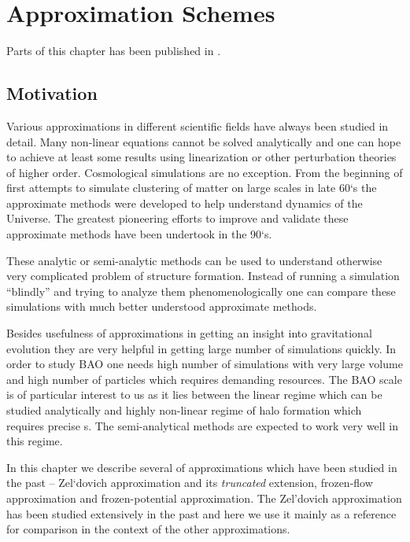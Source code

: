 \chapter{Approximation Schemes}
Parts of this chapter has been published in \textcite{2020MNRAS.493.2085V}.

\section{Motivation}
Various approximations in different scientific fields have always been studied in detail. Many non-linear equations cannot be solved analytically and one can hope to achieve at least some results using linearization or other perturbation theories of higher order. Cosmological simulations are no exception. From the beginning of first attempts to simulate clustering of matter on large scales in late 60`s the approximate methods were developed to help understand dynamics of the Universe. The greatest pioneering efforts to improve and validate these approximate methods have been undertook in the 90`s.

These analytic or semi-analytic methods can be used to understand otherwise very complicated problem of structure formation. Instead of running a simulation ``blindly'' and trying to analyze them phenomenologically one can compare these simulations with much better understood approximate methods.

Besides usefulness of approximations in getting an insight into gravitational evolution they are very helpful in getting large number of simulations quickly. In order to study BAO one needs high number of simulations with very large volume and high number of particles which requires demanding resources. The BAO scale is of particular interest to us as it lies between the linear regime which can be studied analytically and highly non-linear regime of halo formation which requires precise \nbodysim s. The semi-analytical methods are expected to work very well in this regime.

In this chapter we describe several of approximations which have been studied in the past -- Zel`dovich approximation and its \textit{truncated} extension, frozen-flow approximation and frozen-potential approximation. The Zel'dovich approximation has been studied extensively in the past and here we use it mainly as a reference for comparison in the context of the other approximations.

